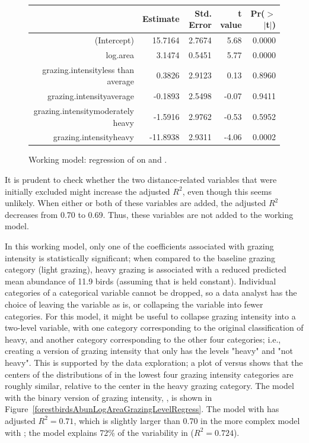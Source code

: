 \begin{figure}[h]
	\centering
	\begin{tabular}{rrrrr}
		\hline
		& Estimate & Std. Error & t value & Pr($>$$|$t$|$) \\ 
		\hline
		(Intercept) & 15.7164 & 2.7674 & 5.68 & 0.0000 \\ 
		log.area & 3.1474 & 0.5451 & 5.77 & 0.0000 \\ 
		grazing.intensityless than average & 0.3826 & 2.9123 & 0.13 & 0.8960 \\ 
		grazing.intensityaverage & -0.1893 & 2.5498 & -0.07 & 0.9411 \\ 
		grazing.intensitymoderately heavy & -1.5916 & 2.9762 & -0.53 & 0.5952 \\ 
		grazing.intensityheavy & -11.8938 & 2.9311 & -4.06 & 0.0002 \\ 
		\hline
	\end{tabular}
	\caption{Working model: regression of  on  and .}
	\label{forestbirdsAbunLogAreaGrazingRegress}
\end{figure}

It is prudent to check whether the two distance-related variables that were initially excluded might increase the adjusted $R^2$, even though this seems unlikely. When either or both of these variables are added, the adjusted $R^2$ decreases from 0.70 to 0.69. Thus, these variables are not added to the working model. 

In this working model, only one of the coefficients associated with grazing intensity is statistically significant; when compared to the baseline grazing category (light grazing), heavy grazing is associated with a reduced predicted mean abundance of 11.9 birds (assuming that  is held constant). Individual categories of a categorical variable cannot be dropped, so a data analyst has the choice of leaving the variable as is, or collapsing the variable into fewer categories. For this model, it might be useful to collapse grazing intensity into a two-level variable, with one category corresponding to the original classification of heavy, and another category corresponding to the other four categories; i.e., creating a version of grazing intensity that only has the levels "heavy" and "not heavy". This is supported by the data exploration; a plot of  versus  shows that the centers of the distributions of  in the lowest four grazing intensity categories are roughly similar, relative to the center in the heavy grazing category. The model with the binary version of grazing intensity, , is shown in Figure~\ref{forestbirdsAbunLogAreaGrazingLevelRegress}. The model with  has adjusted $R^2 = 0.71$, which is slightly larger than 0.70 in the more complex model with ; the model explains 72\% of the variability in  ($R^2 = 0.724$). 

